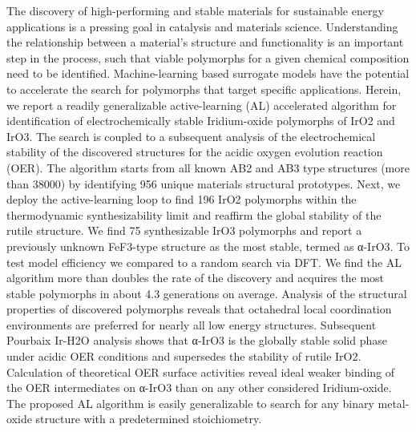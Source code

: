 The discovery of high-performing and stable materials for sustainable energy applications is a pressing goal in catalysis and materials science. Understanding the relationship between a material's structure and functionality is an important step in the process, such that viable polymorphs for a given chemical composition need to be identified. Machine-learning based surrogate models have the potential to accelerate the search for polymorphs that target specific applications. Herein, we report a readily generalizable active-learning (AL) accelerated algorithm for identification of electrochemically stable Iridium-oxide polymorphs of IrO2 and IrO3. The search is coupled to a subsequent analysis of the electrochemical stability of the discovered structures for the acidic oxygen evolution reaction (OER). The algorithm starts from all known AB2 and AB3 type structures (more than 38000) by identifying 956 unique materials structural prototypes. Next, we deploy the active-learning loop to  find 196 IrO2 polymorphs within the thermodynamic synthesizability limit and reaffirm the global stability of the rutile structure. We find 75 synthesizable IrO3 polymorphs and report a previously unknown FeF3-type structure as the most stable, termed as α-IrO3. To test model efficiency we compared to a random search via DFT. We find the AL algorithm more than doubles the rate of the discovery and acquires the most stable polymorphs in about 4.3 generations on average. Analysis of the structural properties of discovered polymorphs reveals that octahedral local coordination environments are preferred for nearly all low energy structures. Subsequent Pourbaix Ir-H2O analysis shows that α-IrO3 is the globally stable solid phase under acidic OER conditions and supersedes the stability of rutile IrO2. Calculation of theoretical OER surface activities reveal ideal weaker binding of the OER intermediates on α-IrO3 than on any other considered Iridium-oxide. The proposed AL algorithm  is easily generalizable to search for any binary metal-oxide structure with a predetermined stoichiometry.
